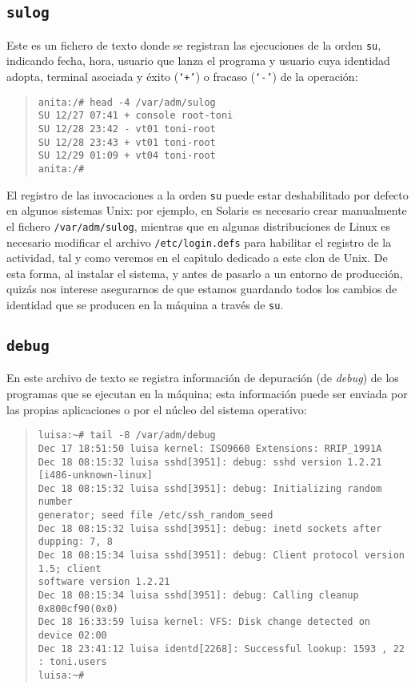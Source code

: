 \subsection{{\tt sulog}}
Este es un fichero de texto donde se registran las ejecuciones de la orden
{\tt su}, indicando fecha, hora, usuario que lanza el programa y usuario cuya
identidad adopta, terminal asociada y \'exito ({\tt `+'}) o fracaso ({\tt `-'}) 
de la operaci\'on:
\begin{quote}
\begin{verbatim}
anita:/# head -4 /var/adm/sulog
SU 12/27 07:41 + console root-toni
SU 12/28 23:42 - vt01 toni-root
SU 12/28 23:43 + vt01 toni-root
SU 12/29 01:09 + vt04 toni-root
anita:/#
\end{verbatim}
\end{quote}
El registro de las invocaciones a la orden {\tt su} puede estar deshabilitado
por defecto en algunos sistemas Unix: por ejemplo, en Solaris es necesario crear
manualmente el fichero {\tt /var/adm/sulog}, mientras que en algunas 
distribuciones de Linux es necesario modificar el archivo {\tt /etc/login.defs}
para habilitar el registro de la actividad, tal y como veremos en el 
cap\'{\i}tulo dedicado a este clon de Unix. De esta forma, al instalar el 
sistema, y antes de pasarlo a un entorno de producci\'on, quiz\'as nos 
interese asegurarnos de que estamos guardando todos los cambios de identidad 
que se producen en la m\'aquina a trav\'es de {\tt su}.
\subsection{{\tt debug}}
En este archivo de texto se registra informaci\'on de depuraci\'on (de {\it
debug}) de los programas que se ejecutan en la m\'aquina; esta informaci\'on
puede ser enviada por las propias aplicaciones o por el n\'ucleo del sistema
operativo:
\begin{quote}
\begin{verbatim}
luisa:~# tail -8 /var/adm/debug
Dec 17 18:51:50 luisa kernel: ISO9660 Extensions: RRIP_1991A
Dec 18 08:15:32 luisa sshd[3951]: debug: sshd version 1.2.21 
[i486-unknown-linux]
Dec 18 08:15:32 luisa sshd[3951]: debug: Initializing random number 
generator; seed file /etc/ssh_random_seed
Dec 18 08:15:32 luisa sshd[3951]: debug: inetd sockets after dupping: 7, 8
Dec 18 08:15:34 luisa sshd[3951]: debug: Client protocol version 1.5; client 
software version 1.2.21
Dec 18 08:15:34 luisa sshd[3951]: debug: Calling cleanup 0x800cf90(0x0)
Dec 18 16:33:59 luisa kernel: VFS: Disk change detected on device 02:00
Dec 18 23:41:12 luisa identd[2268]: Successful lookup: 1593 , 22 : toni.users
luisa:~#
\end{verbatim}
\end{quote}
